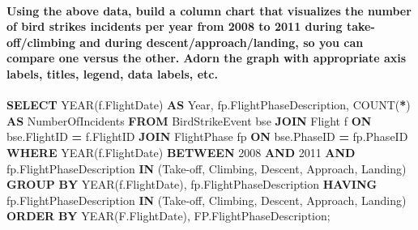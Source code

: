 \documentclass[
]{article}
\newenvironment{Shaded}{\begin{snugshade}}{\end{snugshade}}
\newcommand{\DataTypeTok}[1]{\textcolor[rgb]{0.13,0.29,0.53}{#1}}
\newcommand{\DecValTok}[1]{\textcolor[rgb]{0.00,0.00,0.81}{#1}}
\newcommand{\FunctionTok}[1]{\textcolor[rgb]{0.00,0.00,0.00}{#1}}
\newcommand{\KeywordTok}[1]{\textcolor[rgb]{0.13,0.29,0.53}{\textbf{#1}}}
\newcommand{\NormalTok}[1]{#1}
\newcommand{\OperatorTok}[1]{\textcolor[rgb]{0.81,0.36,0.00}{\textbf{#1}}}
\newcommand{\StringTok}[1]{\textcolor[rgb]{0.31,0.60,0.02}{#1}}
\begin{document}
\hypertarget{using-the-above-data-build-a-column-chart-that-visualizes-the-number-of-bird-strikes-incidents-per-year-from-2008-to-2011-during-take-offclimbing-and-during-descentapproachlanding-so-you-can-compare-one-versus-the-other.-adorn-the-graph-with-appropriate-axis-labels-titles-legend-data-labels-etc.}{%
\paragraph{Using the above data, build a column chart that visualizes
the number of bird strikes incidents per year from 2008 to 2011 during
take-off/climbing and during descent/approach/landing, so you can
compare one versus the other. Adorn the graph with appropriate axis
labels, titles, legend, data labels,
etc.}\label{using-the-above-data-build-a-column-chart-that-visualizes-the-number-of-bird-strikes-incidents-per-year-from-2008-to-2011-during-take-offclimbing-and-during-descentapproachlanding-so-you-can-compare-one-versus-the-other.-adorn-the-graph-with-appropriate-axis-labels-titles-legend-data-labels-etc.}}

\begin{Shaded}
\begin{Highlighting}[]
\KeywordTok{SELECT} 
    \DataTypeTok{YEAR}\NormalTok{(f.FlightDate) }\KeywordTok{AS} \DataTypeTok{Year}\NormalTok{,}
\NormalTok{    fp.FlightPhaseDescription,}
    \FunctionTok{COUNT}\NormalTok{(}\OperatorTok{*}\NormalTok{) }\KeywordTok{AS}\NormalTok{ NumberOfIncidents}
\KeywordTok{FROM} 
\NormalTok{    BirdStrikeEvent bse}
\KeywordTok{JOIN} 
\NormalTok{    Flight f }\KeywordTok{ON}\NormalTok{ bse.FlightID }\OperatorTok{=}\NormalTok{ f.FlightID}
\KeywordTok{JOIN} 
\NormalTok{    FlightPhase fp }\KeywordTok{ON}\NormalTok{ bse.PhaseID }\OperatorTok{=}\NormalTok{ fp.PhaseID}
\KeywordTok{WHERE} 
    \DataTypeTok{YEAR}\NormalTok{(f.FlightDate) }\KeywordTok{BETWEEN} \DecValTok{2008} \KeywordTok{AND} \DecValTok{2011}
    \KeywordTok{AND}\NormalTok{ fp.FlightPhaseDescription }\KeywordTok{IN}\NormalTok{ (}\StringTok{\textquotesingle{}Take{-}off\textquotesingle{}}\NormalTok{, }\StringTok{\textquotesingle{}Climbing\textquotesingle{}}\NormalTok{, }\StringTok{\textquotesingle{}Descent\textquotesingle{}}\NormalTok{, }\StringTok{\textquotesingle{}Approach\textquotesingle{}}\NormalTok{, }\StringTok{\textquotesingle{}Landing\textquotesingle{}}\NormalTok{)}
\KeywordTok{GROUP} \KeywordTok{BY} 
    \DataTypeTok{YEAR}\NormalTok{(f.FlightDate),}
\NormalTok{    fp.FlightPhaseDescription}
\KeywordTok{HAVING} 
\NormalTok{    fp.FlightPhaseDescription }\KeywordTok{IN}\NormalTok{ (}\StringTok{\textquotesingle{}Take{-}off\textquotesingle{}}\NormalTok{, }\StringTok{\textquotesingle{}Climbing\textquotesingle{}}\NormalTok{, }\StringTok{\textquotesingle{}Descent\textquotesingle{}}\NormalTok{, }\StringTok{\textquotesingle{}Approach\textquotesingle{}}\NormalTok{, }\StringTok{\textquotesingle{}Landing\textquotesingle{}}\NormalTok{)}
\KeywordTok{ORDER} \KeywordTok{BY} 
    \DataTypeTok{YEAR}\NormalTok{(F.FlightDate), FP.FlightPhaseDescription;}
\end{Highlighting}
\end{Shaded}
\end{document}
